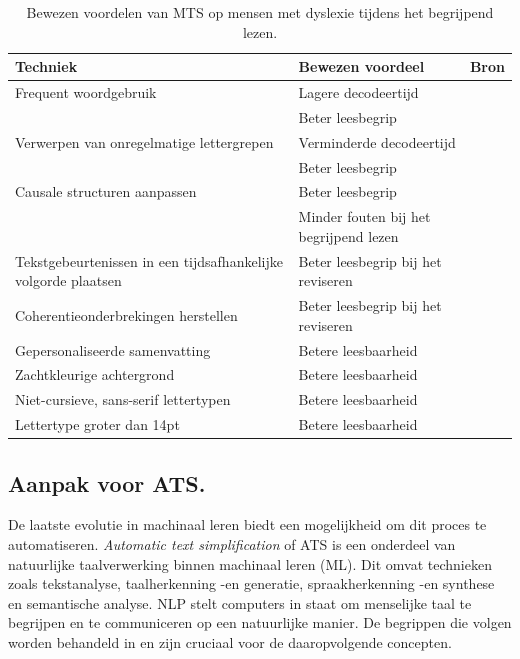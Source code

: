 \begin{center}
	\begin{table}[H]
	\begin{tabular}{ | m{5cm} | m{5cm} | m{5cm} | } 
	\hline
	\textbf{Techniek} & \textbf{Bewezen voordeel} & \textbf{Bron}\\
	\hline
	Frequent woordgebruik & Lagere decodeertijd & \autocite{Rello2013a, Gala2016} \\
	& Beter leesbegrip & \autocite{Rello2013a, Gala2016} \\
	\hline	
	Verwerpen van onregelmatige lettergrepen & Verminderde decodeertijd & \autocite{Gala2016} \\
	& Beter leesbegrip & \autocite{Gala2016} \\	
	\hline
	Causale structuren aanpassen & Beter leesbegrip & \autocite{Linderholm2000} \\
	& Minder fouten bij het begrijpend lezen & \autocite{Linderholm2000} \\
	\hline	
	Tekstgebeurtenissen in een tijdsafhankelijke volgorde plaatsen & Beter leesbegrip bij het reviseren & \autocite{Leroy2013} \\
	\hline
	Coherentieonderbrekingen herstellen & Beter leesbegrip bij het reviseren & \autocite{Leroy2013} \\
	\hline
	Gepersonaliseerde samenvatting & Betere leesbaarheid & \autocite{Nandhini2013} \\
	\hline
	Zachtkleurige achtergrond & Betere leesbaarheid & \autocite{Rello2015} \\
	\hline
	Niet-cursieve, sans-serif lettertypen & Betere leesbaarheid & \autocite{Rello2013b} \\
	\hline 
	Lettertype groter dan 14pt & Betere leesbaarheid & \autocite{Rello2013b} \\
	\hline
	\end{tabular}
	\caption{Bewezen voordelen van MTS op mensen met dyslexie tijdens het begrijpend lezen.}
	\label{table:benefits-mts}
	\end{table}
\end{center}

\subsection{Aanpak voor ATS.}

De laatste evolutie in machinaal leren biedt een mogelijkheid om dit proces te automatiseren. \textit{Automatic text simplification} of ATS is een onderdeel van natuurlijke taalverwerking binnen machinaal leren (ML). Dit omvat technieken zoals tekstanalyse, taalherkenning -en generatie, spraakherkenning -en synthese en semantische analyse. NLP stelt computers in staat om menselijke taal te begrijpen en te communiceren op een natuurlijke manier. De begrippen die volgen worden behandeld in \textcite{Sohom2019, Eisenstein2019} en zijn cruciaal voor de daaropvolgende concepten.

